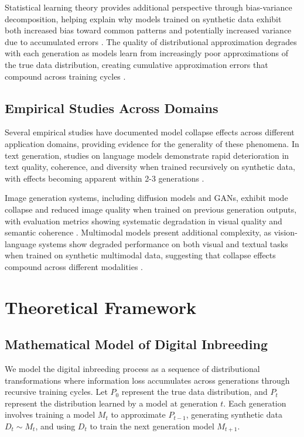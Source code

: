 \documentclass{article}
\begin{document}
Statistical learning theory provides additional perspective through bias-variance decomposition, helping explain why models trained on synthetic data exhibit both increased bias toward common patterns and potentially increased variance due to accumulated errors \cite{hastie2009elements}. The quality of distributional approximation degrades with each generation as models learn from increasingly poor approximations of the true data distribution, creating cumulative approximation errors that compound across training cycles \cite{wasserman2006all}.

\subsection{Empirical Studies Across Domains}

Several empirical studies have documented model collapse effects across different application domains, providing evidence for the generality of these phenomena. In text generation, studies on language models demonstrate rapid deterioration in text quality, coherence, and diversity when trained recursively on synthetic data, with effects becoming apparent within 2-3 generations \cite{alemohammad2023self}.

Image generation systems, including diffusion models and GANs, exhibit mode collapse and reduced image quality when trained on previous generation outputs, with evaluation metrics showing systematic degradation in visual quality and semantic coherence \cite{borji2022pros}. Multimodal models present additional complexity, as vision-language systems show degraded performance on both visual and textual tasks when trained on synthetic multimodal data, suggesting that collapse effects compound across different modalities \cite{radford2021learning}.

\section{Theoretical Framework}

\subsection{Mathematical Model of Digital Inbreeding}

We model the digital inbreeding process as a sequence of distributional transformations where information loss accumulates across generations through recursive training cycles. Let $P_0$ represent the true data distribution, and $P_t$ represent the distribution learned by a model at generation $t$. Each generation involves training a model $M_t$ to approximate $P_{t-1}$, generating synthetic data $D_t \sim M_t$, and using $D_t$ to train the next generation model $M_{t+1}$.
\end{document}
